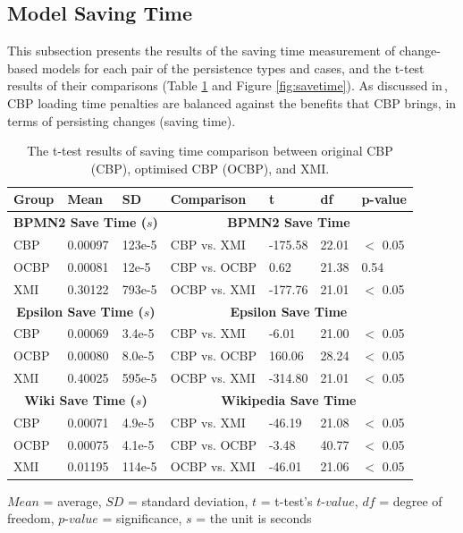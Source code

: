{\subsection{Model Saving Time}
\label{subsec:saving_time_test}
This subsection presents the results of the saving time measurement of change-based models for each pair of the persistence types and cases, and the t-test results of their comparisons (Table \ref{table:ttest_results_savetime} and Figure \ref{fig:savetime}). As discussed in\,\cite{yohannis2017turning}, CBP loading time penalties are balanced against the benefits that CBP brings, in terms of  persisting changes (saving time).

\begin{table}[ht]
\footnotesize
\centering
\caption{The t-test results of saving time comparison between original CBP (CBP), optimised CBP (OCBP), and XMI.}
\label{table:ttest_results_savetime}
\begin{tabular}
{|p{}p{}p{}|p{}p{}p{}p{}|}
\hline 

Group & Mean & SD & Comparison & t  & df & p-value \\
\hline 
\multicolumn{3}{|c|}{\textbf{BPMN2 Save Time ($s$)}} & \multicolumn{4}{c|}{\textbf{BPMN2 Save Time}}\\
CBP & 0.00097    & 123e-5 & CBP vs. XMI &  -175.58    & 22.01 & $<$ 0.05 \\  
OCBP & 0.00081   & 12e-5 & CBP vs. OCBP & 0.62 & 21.38  & 0.54 \\  
XMI & 0.30122   & 793e-5 & OCBP vs. XMI & -177.76    & 21.01  & $<$ 0.05 \\ 
\hline 

\multicolumn{3}{|c|}{\textbf{Epsilon Save Time ($s$)}} & \multicolumn{4}{c|}{\textbf{Epsilon Save Time}}\\
CBP & 0.00069    & 3.4e-5 &  CBP vs. XMI & -6.01   &21.00 & $<$ 0.05 \\
OCBP & 0.00080   & 8.0e-5 & CBP vs. OCBP & 160.06 & 28.24 & $<$ 0.05 \\  
XMI & 0.40025   & 595e-5 & OCBP vs. XMI & -314.80  & 21.01  & $<$ 0.05 \\ 
\hline 

\multicolumn{3}{|c|}{\textbf{Wiki Save Time ($s$)}} & \multicolumn{4}{c|}{\textbf{Wikipedia Save Time}}\\
CBP & 0.00071     & 4.9e-5 & CBP vs. XMI &  -46.19   & 21.08 & $<$ 0.05 \\ 
OCBP &0.00075   &  4.1e-5 & CBP vs. OCBP &   -3.48 & 40.77 & $<$ 0.05 \\ 
XMI &  0.01195   & 114e-5 & OCBP vs. XMI &  -46.01  & 21.06 & $<$ 0.05 \\ 
\hline
\end{tabular}
\justify
$Mean$ = average, $SD$ = standard deviation, $t$ = t-test's $t$-$value$, $df$ = degree of freedom, $p$-$value$ = significance, $s$ = the unit is seconds
\end{table}



}
